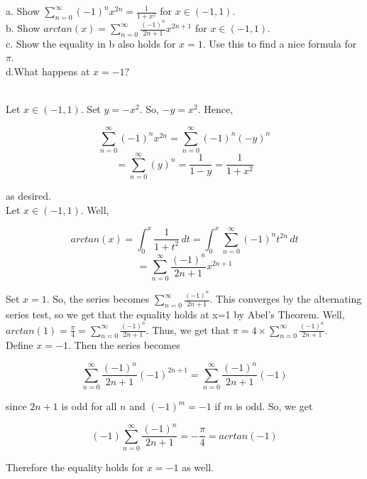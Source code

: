 a. Show $\sum_{n=0}^{\infty}(-1)^nx^{2n}=\frac{1}{1+x^2}$ for $x\in(-1,1)$.\\

b. Show $arctan(x)=\sum_{n=0}^{\infty}\frac{(-1)^n}{2n+1}x^{2n+1}$ for $x\in(-1,1)$.\\

c. Show the equality in b also holds for $x=1$. Use this to find a nice formula for $\pi$.\\

d.What happens at $x=-1$?\\

\begin{solution}\renewcommand{\qedsymbol}{}\ \\
    Let $x\in(-1,1)$. Set $y=-x^2$. So, $-y=x^2$. Hence,
    
    $$\sum_{n=0}^{\infty}(-1)^nx^{2n}=\sum_{n=0}^{\infty}(-1)^n(-y)^{n}$$
    $$=\sum_{n=0}^{\infty}(y)^n=\frac{1}{1-y}=\frac{1}{1+x^2}$$
    
    as desired.\\

    Let $x\in(-1,1)$. Well,
    
    $$arctan(x)=\int_{0}^{x}\frac{1}{1+t^2}\,dt=\int_{0}^{x}\sum_{n=0}^{\infty}(-1)^nt^{2n}\,dt$$
    $$=\sum_{n=0}^{\infty}\frac{(-1)^n}{2n+1}x^{2n+1}$$

    Set $x=1$. So, the series becomes $\sum_{n=0}^{\infty}\frac{(-1)^n}{2n+1}$. This converges by the
    alternating series test, so we get that the equality holds at x=1 by Abel's Theorem. Well,
    $arctan(1)=\frac{\pi}{4}=\sum_{n=0}^{\infty}\frac{(-1)^n}{2n+1}$. Thus, we get that
    $\pi=4\times\sum_{n=0}^{\infty}\frac{(-1)^n}{2n+1}$.\\

    Define $x=-1$. Then the series becomes
    
    $$\sum_{n=0}^{\infty}\frac{(-1)^n}{2n+1}(-1)^{2n+1}=\sum_{n=0}^{\infty}\frac{(-1)^n}{2n+1}(-1)$$
    
    since $2n+1$ is odd for all $n$ and $(-1)^m=-1$ if $m$ is odd. So, we get
    
    $$(-1)\sum_{n=0}^{\infty}\frac{(-1)^n}{2n+1}=-\frac{\pi}{4}=acrtan(-1)$$
    
    Therefore the equality holds for $x=-1$ as well.\\

\end{solution}